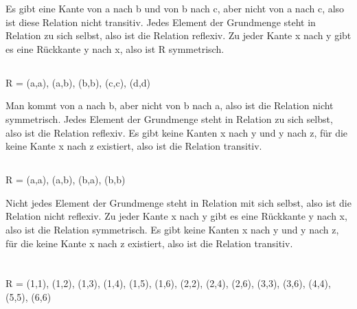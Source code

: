 \documentclass[10pt,a4paper,oneside,ngerman,numbers=noenddot]{scrartcl}
\begin{document}
Es gibt eine Kante von a nach b und von b nach c, aber nicht von a nach c, also ist diese Relation nicht transitiv. Jedes Element der Grundmenge steht in Relation zu sich selbst, also ist die Relation reflexiv. Zu jeder Kante x nach y gibt es eine Rückkante y nach x, also ist R symmetrisch.
\subsection{} %
R = {(a,a), (a,b), (b,b), (c,c), (d,d)}


Man kommt von a nach b, aber nicht von b nach a, also ist die Relation nicht symmetrisch. Jedes Element der Grundmenge steht in Relation zu sich selbst, also ist die Relation reflexiv. Es gibt keine Kanten x nach y und y nach z, für die keine Kante x nach z existiert, also ist die Relation transitiv.
\subsection{} %
R = {(a,a), (a,b), (b,a), (b,b)}


Nicht jedes Element der Grundmenge steht in Relation mit sich selbst, also ist die Relation nicht reflexiv. Zu jeder Kante x nach y gibt es eine Rückkante y nach x, also ist die Relation symmetrisch. Es gibt keine Kanten x nach y und y nach z, für die keine Kante x nach z existiert, also ist die Relation transitiv.
\section{} %
\subsection{} %
R = {(1,1), (1,2), (1,3), (1,4), (1,5), (1,6), (2,2), (2,4), (2,6), (3,3), (3,6), (4,4), (5,5), (6,6)}
\end{document}
